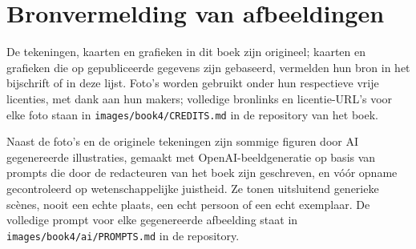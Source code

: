 \chapter*{Bronvermelding van afbeeldingen}

De tekeningen, kaarten en grafieken in dit boek zijn origineel; kaarten en
grafieken die op gepubliceerde gegevens zijn gebaseerd, vermelden hun bron in
het bijschrift of in deze lijst. Foto's worden gebruikt onder hun respectieve
vrije licenties, met dank aan hun makers; volledige bronlinks en
licentie-URL's voor elke foto staan in \texttt{images/book4/CREDITS.md} in de
repository van het boek.

\bigskip
Naast de foto's en de originele tekeningen zijn sommige figuren door AI
gegenereerde illustraties, gemaakt met OpenAI-beeldgeneratie op basis van
prompts die door de redacteuren van het boek zijn geschreven, en vóór opname
gecontroleerd op wetenschappelijke juistheid. Ze tonen uitsluitend generieke
scènes, nooit een echte plaats, een echt persoon of een echt exemplaar. De
volledige prompt voor elke gegenereerde afbeelding staat in
\texttt{images/book4/ai/PROMPTS.md} in de repository.

